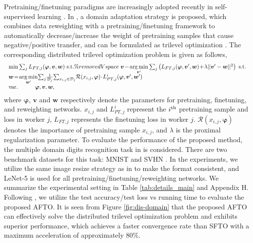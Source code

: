 \documentclass[letterpaper]{article} %
\begin{document}
Pretraining/finetuning paradigms are increasingly adopted recently in self-supervised
learning \cite{he2020momentum}.  In \cite{raghu2021meta}, a domain adaptation strategy is proposed, which combines data reweighting with a pretraining/finetuning framework to automatically
decrease/increase the weight of pretraining samples that cause negative/positive transfer, and can be formulated as trilevel optimization \cite{choe2022betty}. The corresponding distributed trilevel optimization problem is given as follows,
\begin{equation}
\begin{array}{l}
\; \mathop {\min } \sum\nolimits_{j} L_{FT,j}({\boldsymbol{\varphi }} ,{\boldsymbol{v}},{\boldsymbol{w}}) \;{\mathop{\rm s.t.}} \%removedVspace

\; {\boldsymbol{v}}\! =\! \mathop {\arg \min }\limits_{{\boldsymbol{v}}'} \sum\nolimits_{j} \left(L_{FT,j}({\boldsymbol{\varphi }} ,{\boldsymbol{v}}',{\boldsymbol{w}}) \!+\! \lambda ||{\boldsymbol{v}}' -{\boldsymbol{w}} ||^2  \right) \;{\mathop{\rm s.t.}} \\

\; {\boldsymbol{w}}\! =\! \mathop {\arg \min }\limits_{{\boldsymbol{w}}'} \!\sum\nolimits_{j} \! \frac{1}{\mathcal{D}_j}\!\sum\nolimits_{x_{i,j}\in\mathcal{D}_j}\! \mathcal{R}(x_{i,j}, {\boldsymbol{\varphi }})\!\cdot \! L_{PT,j}^i({\boldsymbol{\varphi }} ,{\boldsymbol{v}}',{\boldsymbol{w}}')  \\
\;  {\mathop{\rm var.}} \qquad \quad {\boldsymbol{\varphi }} ,{\boldsymbol{v}},{\boldsymbol{w}},
\end{array}
\end{equation}
where ${\boldsymbol{\varphi }}$, ${\boldsymbol{v}}$ and ${\boldsymbol{w}}$ respectively denote the parameters for pretraining, finetuning, and reweighting networks. $x_{i,j}$ and $L_{PT,j}^i$ represent the $i^{\rm{th}}$ pretraining sample and loss in worker $j$, $L_{FT,j}$ represents the finetuning loss in worker $j$. $\mathcal{R}(x_{i,j}, {\boldsymbol{\varphi }})$ denotes the importance of pretraining sample $x_{i,j}$, and $\lambda$ is the proximal regularization parameter. To evaluate the performance of the proposed method, the multiple domain digits recognition task in \cite{qian2019robust,wang2021discriminative} is considered.  There are two benchmark datasets for
this task: MNIST \cite{lecun1998gradient} and SVHN \cite{netzer2011reading}. In the experiments, we utilize the same image resize strategy as in \cite{qian2019robust} to make the format consistent, and LeNet-5 is used for all pretraining/finetuning/reweighting networks. We summarize the experimental setting in Table \ref{tab:details_main} and Appendix H. Following \cite{ji2021bilevel}, we utilize the test accuracy/test loss vs running time to evaluate the proposed AFTO. It is seen from Figure \ref{fig:dis-domain} that the proposed AFTO can effectively solve the distributed trilevel optimization problem and exhibits superior performance,  which achieves a faster convergence rate than SFTO with a maximum acceleration of approximately 80$\%$.
\end{document}
